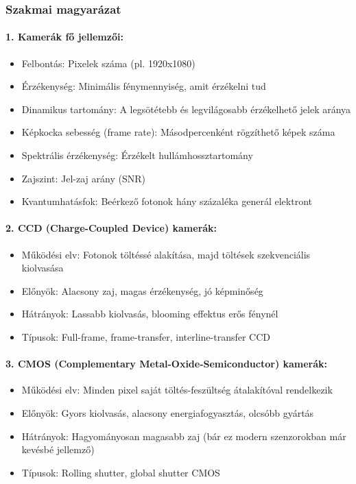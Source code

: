 \documentclass[a4paper,12pt]{article}
\begin{document}
\subsubsection{Szakmai magyarázat}

\paragraph{1. Kamerák fő jellemzői:} \begin{itemize} \item Felbontás: Pixelek száma (pl. 1920x1080) \item Érzékenység: Minimális fénymennyiség, amit érzékelni tud \item Dinamikus tartomány: A legsötétebb és legvilágosabb érzékelhető jelek aránya \item Képkocka sebesség (frame rate): Másodpercenként rögzíthető képek száma \item Spektrális érzékenység: Érzékelt hullámhossztartomány \item Zajszint: Jel-zaj arány (SNR) \item Kvantumhatásfok: Beérkező fotonok hány százaléka generál elektront \end{itemize}

\paragraph{2. CCD (Charge-Coupled Device) kamerák:} \begin{itemize} \item Működési elv: Fotonok töltéssé alakítása, majd töltések szekvenciális kiolvasása \item Előnyök: Alacsony zaj, magas érzékenység, jó képminőség \item Hátrányok: Lassabb kiolvasás, blooming effektus erős fénynél \item Típusok: Full-frame, frame-transfer, interline-transfer CCD \end{itemize}

\paragraph{3. CMOS (Complementary Metal-Oxide-Semiconductor) kamerák:} \begin{itemize} \item Működési elv: Minden pixel saját töltés-feszültség átalakítóval rendelkezik \item Előnyök: Gyors kiolvasás, alacsony energiafogyasztás, olcsóbb gyártás \item Hátrányok: Hagyományosan magasabb zaj (bár ez modern szenzorokban már kevésbé jellemző) \item Típusok: Rolling shutter, global shutter CMOS \end{itemize}
\end{document}
